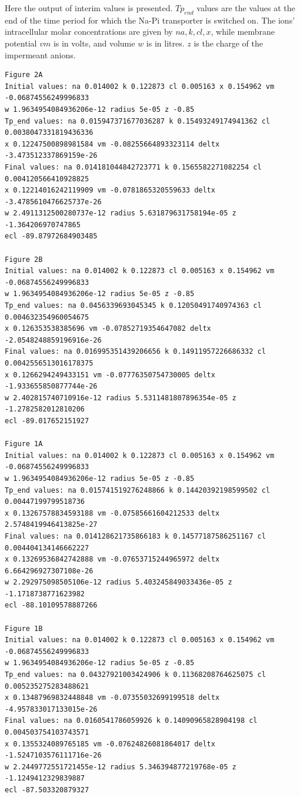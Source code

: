 \documentclass[11pt]{article}[]
\begin{document}
Here the output of interim values is presented. $Tp_{end}$ values are the values at the end of the time period for which the Na-Pi transporter is switched on. The ions' intracellular molar concentrations are given by $na, k, cl, x$, while membrane potential $vm$ is in volts, and volume $w$ is in litres. $z$ is the charge of the impermeant anions.

\begin{verbatim}
Figure 2A
Initial values: na 0.014002 k 0.122873 cl 0.005163 x 0.154962 vm -0.06874556249996833
w 1.9634954084936206e-12 radius 5e-05 z -0.85
Tp_end values: na 0.015947371677036287 k 0.15493249174941362 cl 0.0038047331819436336 
x 0.12247500898981584 vm -0.08255664893323114 deltx -3.473512337869159e-26
Final values: na 0.014181044842723771 k 0.1565582271082254 cl 0.004120566410928825 
x 0.12214016242119909 vm -0.0781865320559633 deltx -3.4785610476625737e-26
w 2.4911312500280737e-12 radius 5.631879631758194e-05 z -1.364206970747865
ecl -89.87972684903485

Figure 2B
Initial values: na 0.014002 k 0.122873 cl 0.005163 x 0.154962 vm -0.06874556249996833
w 1.9634954084936206e-12 radius 5e-05 z -0.85
Tp_end values: na 0.0456339693045345 k 0.12050491740974363 cl 0.004632354960054675 
x 0.126353538385696 vm -0.07852719354647082 deltx -2.0548248859196916e-26
Final values: na 0.016995351439206656 k 0.14911957226686332 cl 0.0042556513016178375 
x 0.1266294249433151 vm -0.07776350754730005 deltx -1.933655850877744e-26
w 2.402815740710916e-12 radius 5.5311481807896354e-05 z -1.2782582012810206
ecl -89.017652151927

Figure 1A
Initial values: na 0.014002 k 0.122873 cl 0.005163 x 0.154962 vm -0.06874556249996833
w 1.9634954084936206e-12 radius 5e-05 z -0.85
Tp_end values: na 0.015741519276248866 k 0.14420392198599502 cl 0.00447199799518736 
x 0.13267578834593188 vm -0.07585661604212533 deltx 2.5748419946413825e-27
Final values: na 0.014128621735866183 k 0.14577187586251167 cl 0.004404134146662227 
x 0.13269536842742888 vm -0.07653715244965972 deltx 6.664296927307108e-26
w 2.292975098505106e-12 radius 5.403245849033436e-05 z -1.1718738771623982
ecl -88.10109578887266

Figure 1B
Initial values: na 0.014002 k 0.122873 cl 0.005163 x 0.154962 vm -0.06874556249996833
w 1.9634954084936206e-12 radius 5e-05 z -0.85
Tp_end values: na 0.04327921003424906 k 0.11368208764625075 cl 0.005235275283488621 
x 0.13487969832448848 vm -0.07355032699199518 deltx -4.957833017133015e-26
Final values: na 0.0160541786059926 k 0.14090965828904198 cl 0.004503754103743571 
x 0.1355324089765185 vm -0.07624826081864017 deltx -1.5247103576111716e-26
w 2.2449772551721455e-12 radius 5.346394877219768e-05 z -1.1249412329839887
ecl -87.503320879327
\end{verbatim}
\end{document}
